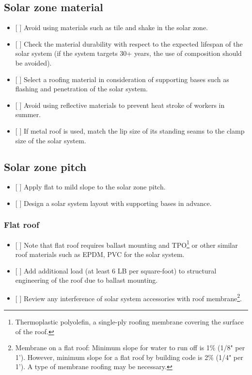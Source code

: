 \documentclass[]{article}
\providecommand{\tightlist}{%
  \setlength{\itemsep}{0pt}\setlength{\parskip}{0pt}}
\let\rmarkdownfootnote\footnote%
\def\footnote{\protect\rmarkdownfootnote}
\begin{document}
\hypertarget{solar-zone-material-1}{%
\subsection{Solar zone material}\label{solar-zone-material-1}}

\begin{itemize}
\tightlist
\item
  {[} {]} Avoid using materials such as tile and shake in the solar
  zone.
\item
  {[} {]} Check the material durability with respect to the expected
  lifespan of the solar system (if the system targets 30+ years, the use
  of composition should be avoided).
\item
  {[} {]} Select a roofing material in consideration of supporting bases
  such as flashing and penetration of the solar system.
\item
  {[} {]} Avoid using reflective materials to prevent heat stroke of
  workers in summer.
\item
  {[} {]} If metal roof is used, match the lip size of its standing
  seams to the clamp size of the solar system.
\end{itemize}

\hypertarget{solar-zone-pitch-1}{%
\subsection{Solar zone pitch}\label{solar-zone-pitch-1}}

\begin{itemize}
\tightlist
\item
  {[} {]} Apply flat to mild slope to the solar zone pitch.
\item
  {[} {]} Design a solar system layout with supporting bases in advance.
\end{itemize}

\hypertarget{flat-roof}{%
\subsubsection{Flat roof}\label{flat-roof}}

\begin{itemize}
\tightlist
\item
  {[} {]} Note that flat roof requires ballast mounting and
  TPO\footnote{Thermoplastic polyolefin, a single-ply roofing membrane
    covering the surface of the roof.} or other similar roof materials
  such as EPDM, PVC for the solar system.
\item
  {[} {]} Add additional load (at least 6 LB per square-foot) to
  structural engineering of the roof due to ballast mounting.
\item
  {[} {]} Review any interference of solar system accessories with roof
  membrane\footnote{Membrane on a flat roof: Minimum slope for water to
    run off is 1\% (1/8" per 1'). However, minimum slope for a flat roof
    by building code is 2\% (1/4" per 1'). A type of membrane roofing
    may be necessary.}.
\end{itemize}
\end{document}
